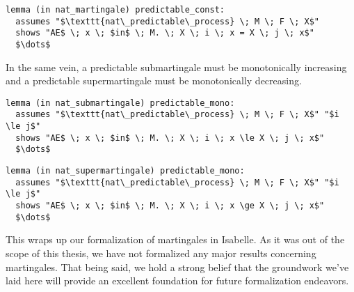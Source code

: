 \begin{isalemma}
{\small
\begin{lstlisting}[style=isabelle]
lemma (in nat_martingale) predictable_const:
  assumes "$\texttt{nat\_predictable\_process} \; M \; F \; X$"
  shows "AE$ \; x \; $in$ \; M. \; X \; i \; x = X \; j \; x$"
  $\dots$
\end{lstlisting}
}
\end{isalemma}

In the same vein, a predictable submartingale must be monotonically increasing and a predictable supermartingale must be monotonically decreasing.

\begin{isalemma}
{\small
\begin{lstlisting}[style=isabelle]
lemma (in nat_submartingale) predictable_mono:
  assumes "$\texttt{nat\_predictable\_process} \; M \; F \; X$" "$i \le j$"
  shows "AE$ \; x \; $in$ \; M. \; X \; i \; x \le X \; j \; x$"
  $\dots$
\end{lstlisting}
}
\end{isalemma}

\begin{isalemma}
{\small
\begin{lstlisting}[style=isabelle]
lemma (in nat_supermartingale) predictable_mono:
  assumes "$\texttt{nat\_predictable\_process} \; M \; F \; X$" "$i \le j$"
  shows "AE$ \; x \; $in$ \; M. \; X \; i \; x \ge X \; j \; x$"
  $\dots$
\end{lstlisting}
}
\end{isalemma}

This wraps up our formalization of martingales in Isabelle. As it was out of the scope of this thesis, we have not formalized any major results concerning martingales. That being said, we hold a strong belief that the groundwork we've laid here will provide an excellent foundation for future formalization endeavors.